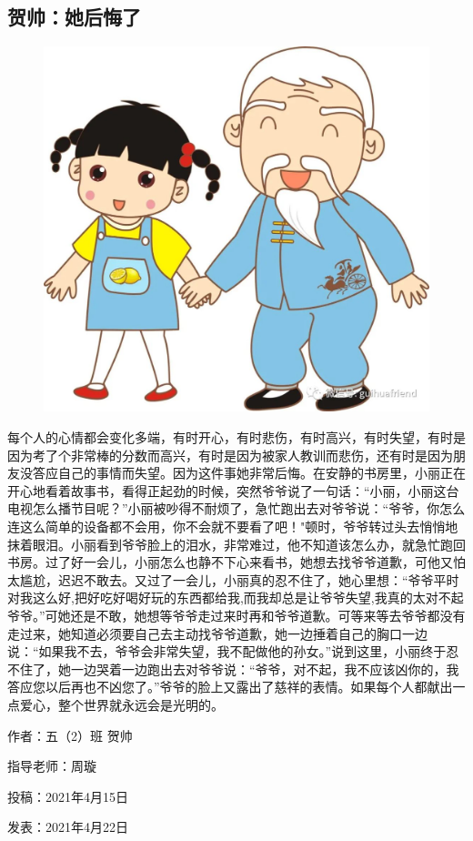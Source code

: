 \vspace{10pt}

{\centering\subsection*{贺帅：她后悔了}}


\renewcommand{\leftmark}{贺帅：她后悔了}

\begin{figure}[htbp]

\centering

\includegraphics[width = .5\textwidth]{./ch/39.jpg}

\end{figure}



每个人的心情都会变化多端，有时开心，有时悲伤，有时高兴，有时失望，有时是因为考了个非常棒的分数而高兴，有时是因为被家人教训而悲伤，还有时是因为朋友没答应自己的事情而失望。因为这件事她非常后悔。在安静的书房里，小丽正在开心地看着故事书，看得正起劲的时候，突然爷爷说了一句话：“小丽，小丽这台电视怎么播节目呢？”小丽被吵得不耐烦了，急忙跑出去对爷爷说：“爷爷，你怎么连这么简单的设备都不会用，你不会就不要看了吧！"顿时，爷爷转过头去悄悄地抹着眼泪。小丽看到爷爷脸上的泪水，非常难过，他不知道该怎么办，就急忙跑回书房。过了好一会儿，小丽怎么也静不下心来看书，她想去找爷爷道歉，可他又怕太尴尬，迟迟不敢去。又过了一会儿，小丽真的忍不住了，她心里想：“爷爷平时对我这么好,把好吃好喝好玩的东西都给我,而我却总是让爷爷失望,我真的太对不起爷爷。”可她还是不敢，她想等爷爷走过来时再和爷爷道歉。可等来等去爷爷都没有走过来，她知道必须要自己去主动找爷爷道歉，她一边捶着自己的胸口一边说：“如果我不去，爷爷会非常失望，我不配做他的孙女。”说到这里，小丽终于忍不住了，她一边哭着一边跑出去对爷爷说：“爷爷，对不起，我不应该凶你的，我答应您以后再也不凶您了。”爷爷的脸上又露出了慈祥的表情。如果每个人都献出一点爱心，整个世界就永远会是光明的。



\vspace{10pt}



作者：五（2）班 贺帅

指导老师：周璇

投稿：2021年4月15日

发表：2021年4月22日


                



\vspace{10pt}

\hline



